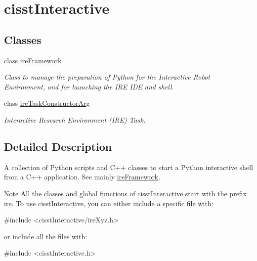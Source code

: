 \hypertarget{group__cisst_interactive}{}\section{cisst\+Interactive}
\label{group__cisst_interactive}
\subsection*{Classes}
\begin{DoxyCompactItemize}
\item 
class \hyperlink{classire_framework}{ire\+Framework}
\begin{DoxyCompactList}\small\item\em Class to manage the preparation of Python for the Interactive Robot Environment, and for launching the I\+R\+E I\+D\+E and shell. \end{DoxyCompactList}\item 
class \hyperlink{classire_task_constructor_arg}{ire\+Task\+Constructor\+Arg}
\begin{DoxyCompactList}\small\item\em Interactive Research Environment (I\+R\+E) Task. \end{DoxyCompactList}\end{DoxyCompactItemize}


\subsection{Detailed Description}
A collection of Python scripts and C++ classes to start a Python interactive shell from a C++ application. See mainly \hyperlink{classire_framework}{ire\+Framework}.

\begin{DoxyNote}{Note}
All the classes and global functions of cisst\+Interactive start with the prefix ire. To use cisst\+Interactive, you can either include a specific file with\+: 
\begin{DoxyCode}
\textcolor{preprocessor}{#include <cisstInteractive/ireXyz.h>}
\end{DoxyCode}
 or include all the files with\+: 
\begin{DoxyCode}
\textcolor{preprocessor}{#include <cisstInteractive.h>}
\end{DoxyCode}
 
\end{DoxyNote}

